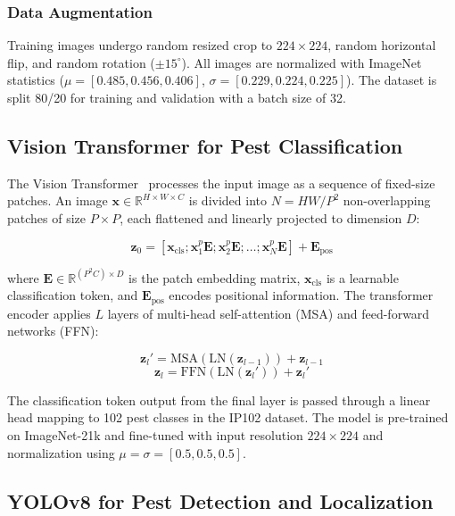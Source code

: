 \documentclass[conference]{IEEEtran}
\begin{document}
\subsubsection{Data Augmentation}
Training images undergo random resized crop to $224 \times 224$, random horizontal flip, and random rotation ($\pm 15^\circ$). All images are normalized with ImageNet statistics ($\mu = [0.485, 0.456, 0.406]$, $\sigma = [0.229, 0.224, 0.225]$). The dataset is split 80/20 for training and validation with a batch size of 32.

\subsection{Vision Transformer for Pest Classification}

The Vision Transformer~\cite{dosovitskiy2021vit} processes the input image as a sequence of fixed-size patches. An image $\mathbf{x} \in \mathbb{R}^{H \times W \times C}$ is divided into $N = HW / P^2$ non-overlapping patches of size $P \times P$, each flattened and linearly projected to dimension $D$:

\begin{equation}
    \mathbf{z}_0 = [\mathbf{x}_{\text{cls}}; \mathbf{x}_1^p \mathbf{E}; \mathbf{x}_2^p \mathbf{E}; \ldots; \mathbf{x}_N^p \mathbf{E}] + \mathbf{E}_{\text{pos}}
\end{equation}

\noindent where $\mathbf{E} \in \mathbb{R}^{(P^2 C) \times D}$ is the patch embedding matrix, $\mathbf{x}_{\text{cls}}$ is a learnable classification token, and $\mathbf{E}_{\text{pos}}$ encodes positional information. The transformer encoder applies $L$ layers of multi-head self-attention (MSA) and feed-forward networks (FFN):

\begin{equation}
    \mathbf{z}_l' = \mathrm{MSA}(\mathrm{LN}(\mathbf{z}_{l-1})) + \mathbf{z}_{l-1}
\end{equation}
\begin{equation}
    \mathbf{z}_l = \mathrm{FFN}(\mathrm{LN}(\mathbf{z}_l')) + \mathbf{z}_l'
\end{equation}

The classification token output from the final layer is passed through a linear head mapping to 102 pest classes in the IP102 dataset. The model is pre-trained on ImageNet-21k and fine-tuned with input resolution $224 \times 224$ and normalization using $\mu = \sigma = [0.5, 0.5, 0.5]$.

\subsection{YOLOv8 for Pest Detection and Localization}
\end{document}
